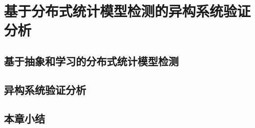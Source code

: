 \chapter{基于分布式统计模型检测的异构系统验证分析}
\label{ch4}

\section{基于抽象和学习的分布式统计模型检测}
\section{异构系统验证分析}

\section{本章小结}
